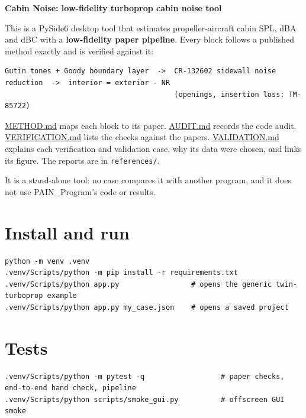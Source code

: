\documentclass[10pt,a4paper]{article}
\begin{document}
{\LARGE\bfseries Cabin Noise: low-fidelity turboprop cabin noise tool\par}\bigskip

This is a PySide6 desktop tool that estimates propeller-aircraft cabin SPL, dBA and dBC with a \textbf{low-fidelity paper pipeline}. Every block follows a published method exactly and is verified against it:

\begin{Verbatim}[breaklines,fontsize=\small,frame=single,rulecolor=\color{gray}]
Gutin tones + Goody boundary layer  ->  CR-132602 sidewall noise reduction  ->  interior = exterior - NR
                                        (openings, insertion loss: TM-85722)
\end{Verbatim}

\href{METHOD.pdf}{METHOD.md} maps each block to its paper. \href{AUDIT.pdf}{AUDIT.md} records the code audit. \href{VERIFICATION.pdf}{VERIFICATION.md} lists the checks against the papers. \href{VALIDATION.pdf}{VALIDATION.md} explains each verification and validation case, why its data were chosen, and links its figure. The reports are in \texttt{references/\allowbreak{}}.

It is a stand-alone tool: no case compares it with another program, and it does not use PAIN\_Program's code or results.

\section*{Install and run}

\begin{Verbatim}[breaklines,fontsize=\small,frame=single,rulecolor=\color{gray}]
python -m venv .venv
.venv/Scripts/python -m pip install -r requirements.txt
.venv/Scripts/python app.py                 # opens the generic twin-turboprop example
.venv/Scripts/python app.py my_case.json    # opens a saved project
\end{Verbatim}

\section*{Tests}

\begin{Verbatim}[breaklines,fontsize=\small,frame=single,rulecolor=\color{gray}]
.venv/Scripts/python -m pytest -q                  # paper checks, end-to-end hand check, pipeline
.venv/Scripts/python scripts/smoke_gui.py          # offscreen GUI smoke
\end{Verbatim}
\end{document}
